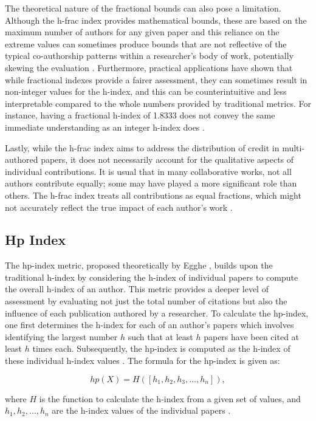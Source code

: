 The theoretical nature of the fractional bounds can also pose a limitation.
Although the h-frac index provides mathematical bounds, these are based on the
maximum number of authors for any given paper and this reliance on the extreme
values can sometimes produce bounds that are not reflective of the typical
co-authorship patterns within a researcher's body of work, potentially skewing
the evaluation \cite{egghe2008mathematical}. Furthermore, practical
applications have shown that while fractional indexes provide a fairer
assessment, they can sometimes result in non-integer values for the h-index,
and this can be counterintuitive and less interpretable compared to the whole
numbers provided by traditional metrics. For instance, having a fractional
h-index of 1.8333 does not convey the same immediate understanding as an
integer h-index does \cite{egghe2008mathematical}.

Lastly, while the h-frac index aims to address the distribution of credit in
multi-authored papers, it does not necessarily account for the qualitative
aspects of individual contributions. It is usual that in many collaborative
works, not all authors contribute equally; some may have played a more
significant role than others. The h-frac index treats all contributions as
equal fractions, which might not accurately reflect the true impact of each
author’s work \cite{egghe2008mathematical,singhal2023analysis}.

\subsection{Hp Index}
The hp-index metric, proposed theoretically by Egghe \cite{egghe2011single},
builds upon the traditional h-index by considering the h-index of individual
papers to compute the overall h-index of an author. This metric provides a
deeper level of assessment by evaluating not just the total number of citations
but also the influence of each publication authored by a researcher. To
calculate the hp-index, one first determines the h-index for each of an
author's papers which involves identifying the largest number $h$ such that at
least $h$ papers have been cited at least $h$ times each. Subsequently, the
hp-index is computed as the h-index of these individual h-index values
\cite{bihari2018h,singhal2023analysis,egghe2011single}. The formula for the
hp-index is given as:

\[
    hp(X) = H([h_1, h_2, h_3, \ldots, h_n]),
\]

where $H$ is the function to calculate the h-index from a given set of values,
and $h_1, h_2, \ldots, h_n$ are the h-index values of the individual papers
\cite{egghe2011single}.

